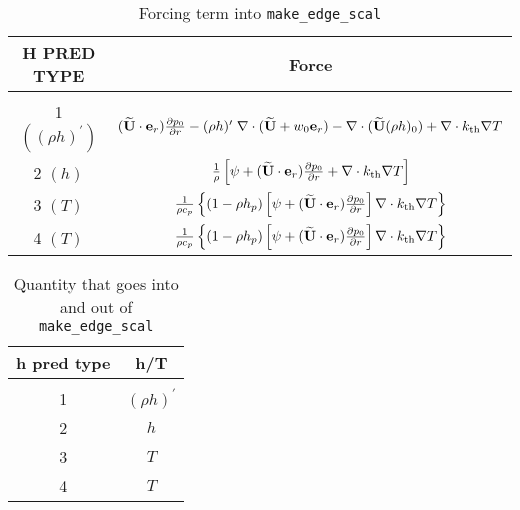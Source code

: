 \begin{table*}[h]
\begin{center}
\caption{Forcing term into {\tt make\_edge\_scal} \newline}
\begin{tabular}{c|c}
\hline
\hline
{H PRED TYPE} &   {Force} \\
\hline \\[-3mm]
1  $((\rho h)^\prime)$ &  $(\widetilde{{\bf U}} \cdot \mathbf{e}_r) \frac{\partial p_0}{\partial r} - 
 (\rho h)^\prime \; \nabla \cdot (\widetilde{{\bf U}}+w_0 \mathbf{e}_r) - 
 \nabla \cdot (\widetilde{{\bf U}} (\rho h)_0) + \nabla \cdot k_{\rm th} \nabla T$ \\[2 mm]
2  $(h)$ & $\frac{1}{\rho} \left [\psi + (\widetilde{{\bf U}} \cdot \mathbf{e}_r)
  \frac{\partial p_0}{\partial r} + \nabla \cdot k_{\rm th} \nabla T \right ]$ \\[2 mm]
3  $(T)$ & $\frac{1}{\rho c_p} \left \{ (1 - \rho h_p) 
   \left [\psi + (\widetilde{{\bf U}} \cdot \mathbf{e}_r) \frac{\partial p_0}{\partial r} \right ] \nabla \cdot k_{\rm th} \nabla T \right \}$ \\[2 mm]
4  $(T)$ & $\frac{1}{\rho c_p} \left\{ (1 - \rho h_p) \left [\psi + (\widetilde{{\bf U}} \cdot \mathbf{e}_r)
\frac{\partial p_0}{\partial r}\right ] \nabla \cdot k_{\rm th} \nabla T \right\}$ \\[2 mm]
\hline
\end{tabular}
\end{center}
\end{table*}

\begin{table*}[h]
\begin{center}
\caption{Quantity that goes into and out of {\tt make\_edge\_scal} \newline}
\begin{tabular}{c|c}
\hline
\hline
{h pred type} & {h/T } \\
\hline \\[-3mm]
1 & $(\rho h)^\prime$ \\
2 & $h$  \\
3 & $T$  \\
4 & $T$  \\
\hline
\end{tabular}
\end{center}
\end{table*}

